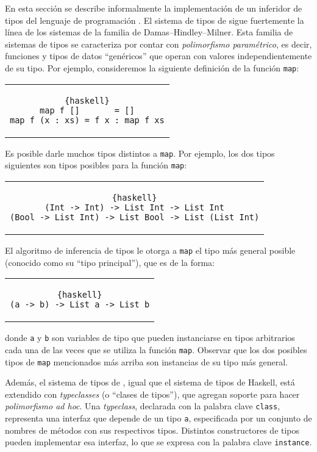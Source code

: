 En esta sección se describe informalmente la implementación de un inferidor
de tipos del lenguaje de programación \nuflo.
El sistema de tipos de \nuflo sigue fuertemente
la línea de los sistemas de la familia de Damas--Hindley--Milner.
Esta familia de sistemas de tipos se caracteriza
por contar con {\em polimorfismo paramétrico},
es decir, funciones y tipos de datos ``genéricos''
que operan con valores independientemente de su tipo.
Por ejemplo, consideremos la siguiente definición de la función \texttt{map}:
\begin{center}
\begin{tabular}{c}
\begin{lstlisting}{haskell}
map f []       = []
map f (x : xs) = f x : map f xs
\end{lstlisting}
\end{tabular}
\end{center}
Es posible darle muchos tipos distintos a \texttt{map}.
Por ejemplo, los dos tipos siguientes
son tipos posibles para la función \texttt{map}:
\begin{center}
\begin{tabular}{c}
\begin{lstlisting}{haskell}
(Int -> Int) -> List Int -> List Int
(Bool -> List Int) -> List Bool -> List (List Int)
\end{lstlisting}
\end{tabular}
\end{center}
El algoritmo de inferencia de tipos le otorga a \texttt{map}
el tipo más general posible (conocido como su ``tipo principal''),
que es de la forma:
\begin{center}
\begin{tabular}{c}
\begin{lstlisting}{haskell}
(a -> b) -> List a -> List b
\end{lstlisting}
\end{tabular}
\end{center}
donde \verb|a| y \verb|b| son variables de tipo que pueden instanciarse
en tipos arbitrarios cada una de las veces que se utiliza la función
\verb|map|. Observar que los dos posibles tipos de \verb|map| mencionados
más arriba son instancias de su tipo más general.
\medskip

Además, el sistema de tipos de \nuflo, igual que el sistema de tipos de
Haskell, está extendido con {\em typeclasses} (o ``clases de tipos''),
que agregan soporte para hacer {\em polimorfismo ad hoc}.
Una {\em typeclass}, declarada con la palabra clave \verb|class|,
representa una interfaz que depende de un tipo \verb|a|,
especificada por un conjunto de nombres de métodos con sus
respectivos tipos.
Distintos constructores de tipos pueden implementar esa interfaz,
lo que se expresa con la palabra clave \verb|instance|.

